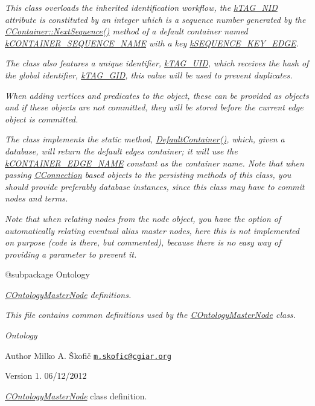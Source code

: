 {\itshape This class overloads the inherited identification workflow, the \hyperlink{}{k\-T\-A\-G\-\_\-\-N\-I\-D} attribute is constituted by an integer which is a sequence number generated by the \hyperlink{class_c_container_afa72f0da28ad8c3955cb9fedbc0ac2df}{C\-Container\-::\-Next\-Sequence()} method of a default container named \hyperlink{}{k\-C\-O\-N\-T\-A\-I\-N\-E\-R\-\_\-\-S\-E\-Q\-U\-E\-N\-C\-E\-\_\-\-N\-A\-M\-E} with a key \hyperlink{}{k\-S\-E\-Q\-U\-E\-N\-C\-E\-\_\-\-K\-E\-Y\-\_\-\-E\-D\-G\-E}.}

{\itshape The class also features a unique identifier, \hyperlink{}{k\-T\-A\-G\-\_\-\-U\-I\-D}, which receives the hash of the global identifier, \hyperlink{}{k\-T\-A\-G\-\_\-\-G\-I\-D}, this value will be used to prevent duplicates.}

{\itshape When adding vertices and predicates to the object, these can be provided as objects and if these objects are not committed, they will be stored before the current edge object is committed.}

{\itshape The class implements the static method, \hyperlink{}{Default\-Container()}, which, given a database, will return the default edges container; it will use the \hyperlink{}{k\-C\-O\-N\-T\-A\-I\-N\-E\-R\-\_\-\-E\-D\-G\-E\-\_\-\-N\-A\-M\-E} constant as the container name. Note that when passing \hyperlink{class_c_connection}{C\-Connection} based objects to the persisting methods of this class, you should provide preferably database instances, since this class may have to commit nodes and terms.}

{\itshape Note that when relating nodes from the node object, you have the option of automatically relating eventual alias master nodes, here this is not implemented on purpose (code is there, but commented), because there is no easy way of providing a parameter to prevent it.}

{\itshape \begin{DoxyVerb} @subpackage        Ontology\end{DoxyVerb}
}

{\itshape \hyperlink{class_c_ontology_master_node}{C\-Ontology\-Master\-Node} definitions.}

{\itshape This file contains common definitions used by the \hyperlink{class_c_ontology_master_node}{C\-Ontology\-Master\-Node} class.}

{\itshape  Ontology}

{\itshape \begin{DoxyAuthor}{Author}
Milko A. Škofič \href{mailto:m.skofic@cgiar.org}{\tt m.\-skofic@cgiar.\-org} 
\end{DoxyAuthor}
\begin{DoxyVersion}{Version}
1. 06/12/2012
\end{DoxyVersion}
{\itshape \hyperlink{class_c_ontology_master_node}{C\-Ontology\-Master\-Node}} class definition.}

